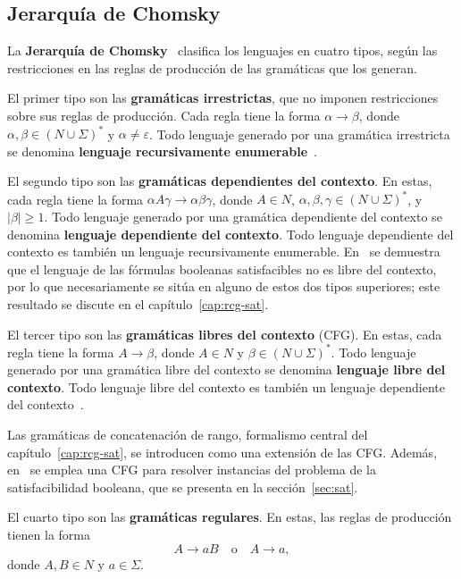 \documentclass{report}
\theoremstyle{definition}
\theoremstyle{plain}
\theoremstyle{remark}
\begin{document}
\subsection{Jerarquía de Chomsky}

La \textbf{Jerarquía de Chomsky}~\cite{hunter2020chomsky} clasifica los
lenguajes en cuatro tipos, según las restricciones en las reglas de
producción de las gramáticas que los generan.

El primer tipo son las \textbf{gramáticas irrestrictas}, que no imponen
restricciones sobre sus reglas de producción. Cada regla tiene la forma
$\alpha \to \beta$, donde $\alpha, \beta \in (N \cup \Sigma)^*$ y
$\alpha \neq \varepsilon$. Todo lenguaje generado por una gramática
irrestricta se denomina \textbf{lenguaje recursivamente
enumerable}~\cite{hopcroft2006introduction}.

El segundo tipo son las \textbf{gramáticas dependientes del contexto}.
En estas, cada regla tiene la forma $\alpha A \gamma \to \alpha \beta \gamma$,
donde $A \in N$, $\alpha, \beta, \gamma \in (N \cup \Sigma)^*$, y
$|\beta| \ge 1$. Todo lenguaje generado por una gramática dependiente
del contexto se denomina \textbf{lenguaje dependiente del contexto}.
Todo lenguaje dependiente del contexto es también un lenguaje
recursivamente enumerable. En~\cite{gomezmolina2025} se demuestra que
el lenguaje de las fórmulas booleanas satisfacibles no es libre del
contexto, por lo que necesariamente se sitúa en alguno de estos dos
tipos superiores; este resultado se discute en el
capítulo~\ref{cap:rcg-sat}.

El tercer tipo son las \textbf{gramáticas libres del contexto} (CFG).
En estas, cada regla tiene la forma $A \to \beta$, donde $A \in N$ y
$\beta \in (N \cup \Sigma)^*$. Todo lenguaje generado por una gramática
libre del contexto se denomina \textbf{lenguaje libre del contexto}.
Todo lenguaje libre del contexto es también un lenguaje dependiente del
contexto~\cite{hopcroft2006introduction}.

Las gramáticas de concatenación de rango, formalismo central del
capítulo~\ref{cap:rcg-sat}, se introducen como una extensión de las
CFG. Además, en~\cite{fernandezarias2007} se emplea una CFG para
resolver instancias del problema de la satisfacibilidad booleana, que
se presenta en la sección~\ref{sec:sat}.

El cuarto tipo son las \textbf{gramáticas regulares}. En estas, las
reglas de producción tienen la forma
\[
  A \to aB \quad \text{o} \quad A \to a,
\]
donde $A, B \in N$ y $a \in \Sigma$.
\end{document}
